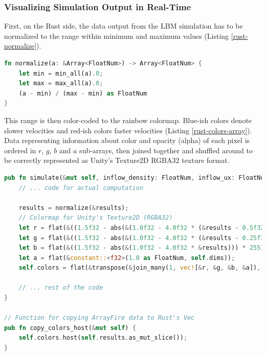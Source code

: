 
\subsubsection{Visualizing Simulation Output in Real-Time}

First, on the Rust side, the data output from the LBM simulation has to be normalized to the range within minimum and maximum values (Listing \ref{rust-normalize}). 

\begin{lstlisting}[language=Rust, caption=Normalization of the simulation output., label=rust-normalize]
fn normalize(a: &Array<FloatNum>) -> Array<FloatNum> {
	let min = min_all(a).0;
	let max = max_all(a).0;
	(a - min) / (max - min) as FloatNum
}
\end{lstlisting}


This range is then color-coded to the rainbow colormap. Blue-ish colors denote slower velocities and red-ish colors faster velocities (Listing \ref{rust-colors-array}). Data representing information about color and opacity (alpha) of each pixel is ordered in $r$, $g$, $b$ and $a$ sub-arrays, then joined together and shuffled around to be correctly represented as Unity's Texture2D RGBA32 texture format.

\begin{lstlisting}[language=Rust, caption=Preparing the data output from Rust side of LBM simulation., label=rust-colors-array]
pub fn simulate(&mut self, inflow_density: FloatNum, inflow_ux: FloatNum, omega: FloatNum) {
	// ... code for actual computation
	
	results = normalize(&results);
	// Colormap for Unity's Texture2D (RGBA32)
	let r = flat(&((1.5f32 - abs(&(1.0f32 - 4.0f32 * (&results - 0.5f32)))) * 255));
	let g = flat(&((1.5f32 - abs(&(1.0f32 - 4.0f32 * (&results - 0.25f32)))) * 255));
	let b = flat(&((1.5f32 - abs(&(1.0f32 - 4.0f32 * &results))) * 255));
	let a = flat(&constant::<f32>(1.0 as FloatNum, self.dims));
	self.colors = flat(&transpose(&join_many(1, vec![&r, &g, &b, &a]), false)).cast::<u8>();
	
	// ... rest of the code
}

// Function for copying ArrayFire data to Rust's Vec
pub fn copy_colors_host(&mut self) {
	self.colors.host(self.results.as_mut_slice());
}
\end{lstlisting}

